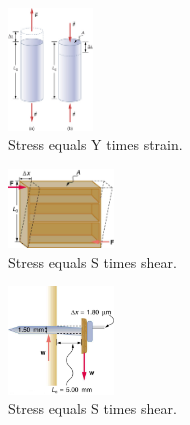 \documentclass{article}
\begin{document}
\begin{figure}[hb]
\centering
\includegraphics[width=0.2\textwidth]{figures/strain.jpeg}
\caption{\label{fig:2} Stress equals Y times strain.}
\end{figure}

\begin{figure}[hb]
\centering
\includegraphics[width=0.25\textwidth]{figures/shelf.jpeg}
\caption{\label{fig:3} Stress equals S times shear.}
\end{figure}

\begin{figure}[hb]
\centering
\includegraphics[width=0.25\textwidth]{figures/nail.jpeg}
\caption{\label{fig:3} Stress equals S times shear.}
\end{figure}
\end{document}
